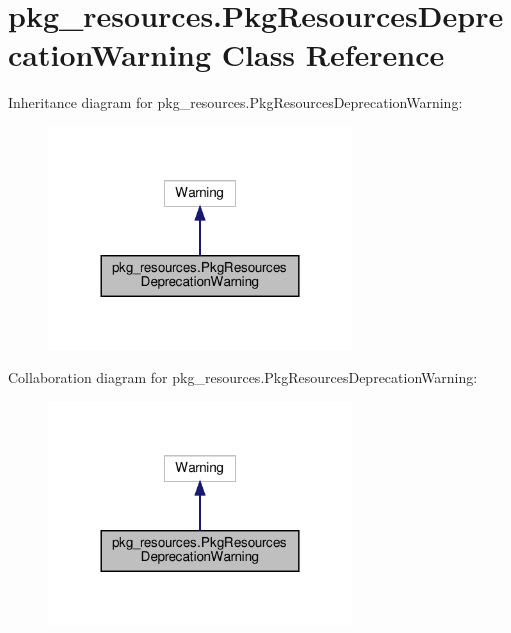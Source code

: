 \hypertarget{classpkg__resources_1_1PkgResourcesDeprecationWarning}{}\section{pkg\+\_\+resources.\+Pkg\+Resources\+Deprecation\+Warning Class Reference}
\label{classpkg__resources_1_1PkgResourcesDeprecationWarning}


Inheritance diagram for pkg\+\_\+resources.\+Pkg\+Resources\+Deprecation\+Warning\+:
\nopagebreak
\begin{figure}[H]
\begin{center}
\leavevmode
\includegraphics[width=228pt]{classpkg__resources_1_1PkgResourcesDeprecationWarning__inherit__graph}
\end{center}
\end{figure}


Collaboration diagram for pkg\+\_\+resources.\+Pkg\+Resources\+Deprecation\+Warning\+:
\nopagebreak
\begin{figure}[H]
\begin{center}
\leavevmode
\includegraphics[width=228pt]{classpkg__resources_1_1PkgResourcesDeprecationWarning__coll__graph}
\end{center}
\end{figure}


